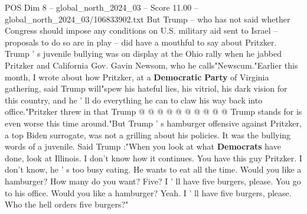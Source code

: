 \begin{textsample}{POS Dim 8 – global\_north\_2024\_03 – Score 11.00 – global\_north\_2024\_03/106833902.txt}
But Trump -- who has not said whether Congress should impose any conditions on U.S. military aid sent to Israel -- proposals to do so are in play -- did have a mouthful to say about Pritzker.
Trump ' s juvenile bullying was on display at the Ohio rally when he jabbed Pritzker and California Gov.
Gavin Newsom, who he calls"Newscum."Earlier this month, I wrote about how Pritzker, at a \textbf{Democratic} \textbf{Party} of Virginia gathering, said Trump will"spew his hateful lies, his vitriol, his dark vision for this country, and he ' ll do everything he can to claw his way back into office."Pritzker threw in that Trump @ @ @ @ @ @ @ @ @ @ Trump stands for is even worse this time around."But Trump ' s hamburger offensive against Pritzker, a top Biden surrogate, was not a grilling about his policies.
It was the bullying words of a juvenile.
Said Trump :"When you look at what \textbf{Democrats} have done, look at Illinois.
I don't know how it continues.
You have this guy Pritzker.
I don't know, he ' s too busy eating.
He wants to eat all the time.
Would you like a hamburger?
How many do you want?
Five?
I ' ll have five burgers, please.
You go to his office.
Would you like a hamburger?
Yeah.
I ' ll have five burgers, please.
Who the hell orders five burgers?"

\end{textsample}
